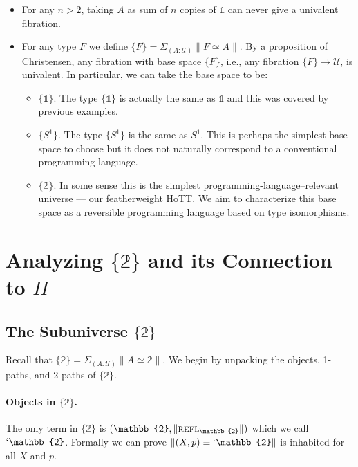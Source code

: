 \documentclass[format=acmlarge,review,natbib]{acmart}
\newcommand{\reflp}{\textsc{refl}}
\newcommand{\ot}{\mathbb{1}}
\newcommand{\bt}{\mathbb{2}}
\begin{document}
\begin{itemize}
\item For any $n > 2$, taking $A$ as sum of $n$ copies of $\ot$ can never
  give a univalent fibration.

\item For any type $F$ we define
  $\{F\} = \Sigma_{(A : \mathcal{U})} \| F \simeq A \|$. By a proposition of
  Christensen, any fibration with base space $\{F\}$, i.e., any fibration
  $\{F\} \to \mathcal{U}$, is univalent. In particular, we can take the base
  space to be:
  \begin{itemize}
  \item $\{\ot\}$. The type $\{\ot\}$ is actually the same as $\ot$ and this was
    covered by previous examples.
  \item $\{S^1\}$. The type $\{S^1\}$ is the same as $S^1$. This is perhaps the
    simplest base space to choose but it does not naturally correspond to a
    conventional programming language.
  \item $\{\bt\}$. In some sense this is the simplest
    programming-language--relevant universe --- our featherweight HoTT. We aim
    to characterize this base space as a reversible programming language based
    on type isomorphisms.
  \end{itemize}

\end{itemize}

\section{Analyzing $\{\bt\}$ and its Connection to $\Pi$}

\subsection{The Subuniverse $\{\bt\}$}

Recall that $\{\bt\} = \Sigma_{(A:\mathcal{U})} \|A \simeq \bt\|$. We begin by
unpacking the objects, 1-paths, and 2-paths of $\{\bt\}$.

\paragraph*{Objects in $\{\bt\}$.} The only term in $\{\bt\}$ is
$(\bt,\|\reflp_{\bt}\|)$ which we call $`\bt$. Formally we can prove
$\|(X,p) \equiv `\bt\|$ is inhabited for all $X$ and $p$.
\end{document}
